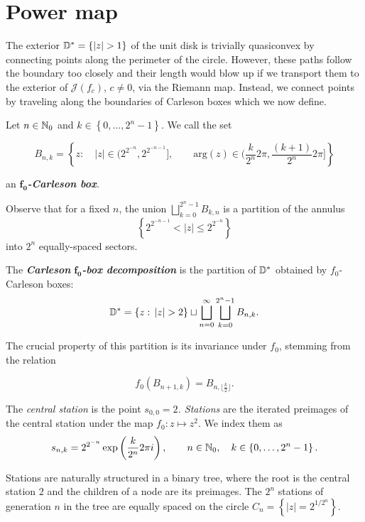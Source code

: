 \section{Power map}

The exterior $\D^{*}=\left\{ \left|z\right|>1\right\} $ of the unit
disk is trivially quasiconvex by connecting points along the perimeter
of the circle. However, these paths follow the boundary too closely
and their length would blow up if we transport them to the exterior
of $\mathcal{J}(f_{c})$, $c\neq0$, via the Riemann map. Instead,
we connect points by traveling along the boundaries of Carleson boxes
which we now define.
\begin{definition}
Let $n\in\mathbb{N}_{0}$ and $k\in\left\{ 0,\ldots,2^{n}-1\right\} $. We
call the set

\[
B_{n,k}=\left\{ z:\quad\left|z\right|\in\biggl(2^{2^{-n}},2^{2^{-n-1}}\biggl],\qquad\mathrm{arg}(z)\in\biggl(\frac{k}{2^{n}}2\pi,\frac{(k+1)}{2^{n}}2\pi\biggl]\right\} 
\]

an \emph{$\boldsymbol{f_{0}}$}\textbf{\emph{-Carleson box}}\emph{.} 

Observe that for a fixed $n$, the union $\bigsqcup_{k=0}^{2^{n}-1}B_{k,n}$
is a partition of the annulus 
\[
\left\{ 2^{2^{-n-1}}<\left|z\right|\leq2^{2^{-n}}\right\} 
\]
 into $2^{n}$ equally-spaced sectors.

The\emph{ }\textbf{\emph{Carleson }}\emph{$\boldsymbol{f_{0}}$}\textbf{\emph{-box
decomposition}} is the partition of $\mathbb{D}^{*}$ obtained by $f_{0}$-Carleson
boxes:
\[
\D^{*}=\left\{ z:\,\left|z\right|>2\right\} \sqcup\bigsqcup_{n=0}^{\infty}\bigsqcup_{k=0}^{2^{n}-1}B_{n,k}.
\]

The crucial property of this partition is its invariance under $f_{0}$,
stemming from the relation

\[
f_{0}\left(B_{n+1,k}\right)=B_{n,\lfloor\frac{k}{2}\rfloor}.
\]
\end{definition}

\begin{comment}
We describe the motion along quasigeodesics as a train drive. Accordingly,
we proceed to define "stations"{} and "tracks".
\end{comment}

\begin{definition}
The \emph{central station }is the point\emph{ $s_{0,0}=2$. Stations
}are the iterated preimages of the central station under the map $f_{0}:z\mapsto z^{2}$.
We index them as 
\[
s_{n,k}=2^{2^{-n}}\exp\left(\frac{k}{2^{n}}2\pi i\right),\qquad n\in\mathbb{N}_{0},\quad k\in\left\{ 0,\ldots,2^{n}-1\right\} .
\]

Stations are naturally structured in a binary tree, where the root
is the central station $2$ and the children of a node are its preimages.
The $2^{n}$ stations of generation $n$ in the tree are equally spaced
on the circle $C_{n}=\left\{ \left|z\right|=2^{1/2^{n}}\right\} $. 


\end{definition}

